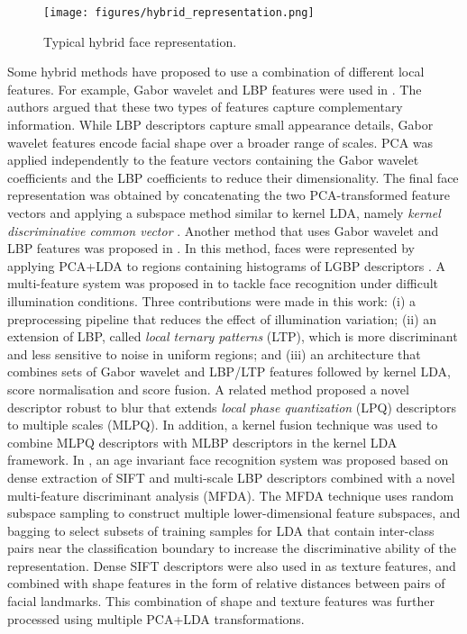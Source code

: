 \documentclass[conference]{IEEEtran}
\begin{document}
\begin{figure}[tb]
    \centering
    \texttt{[image: figures/hybrid\_representation.png]}
    \caption{Typical hybrid face representation.}
    \label{fig:hybrid_representation}
\end{figure}

Some hybrid methods have proposed to use a combination of different local features. For example, Gabor wavelet and LBP features were used in \cite{tan2007fusing}. The authors argued that these two types of features capture complementary information. While LBP descriptors capture small appearance details, Gabor wavelet features encode facial shape over a broader range of scales. PCA was applied independently to the feature vectors containing the Gabor wavelet coefficients and the LBP coefficients to reduce their dimensionality. The final face representation was obtained by concatenating the two PCA-transformed feature vectors and applying a subspace method similar to kernel LDA, namely \textit{kernel discriminative common vector} \cite{cevikalp2006discriminative}. Another method that uses Gabor wavelet and LBP features was proposed in \cite{shan2006ensemble}. In this method, faces were represented by applying PCA+LDA to regions containing histograms of LGBP descriptors \cite{zhang2005local}. A multi-feature system was proposed in \cite{tan2010enhanced} to tackle face recognition under difficult illumination conditions. Three contributions were made in this work: (i) a preprocessing pipeline that reduces the effect of illumination variation; (ii) an extension of LBP, called \textit{local ternary patterns} (LTP), which is more discriminant and less sensitive to noise in uniform regions; and (iii) an architecture that combines sets of Gabor wavelet and LBP/LTP features followed by kernel LDA, score normalisation and score fusion. A related method \cite{chan2013multiscale} proposed a novel descriptor robust to blur that extends \textit{local phase quantization} (LPQ) descriptors \cite{rahtu2012local} to multiple scales (MLPQ). In addition, a kernel fusion technique was used to combine MLPQ descriptors with MLBP descriptors in the kernel LDA framework. In \cite{li2011discriminative}, an age invariant face recognition system was proposed based on dense extraction of SIFT and multi-scale LBP descriptors combined with a novel multi-feature discriminant analysis (MFDA). The MFDA technique uses random subspace sampling \cite{ho1998random} to construct multiple lower-dimensional feature subspaces, and bagging \cite{breiman1996bagging} to select subsets of training samples for LDA that contain inter-class pairs near the classification boundary to increase the discriminative ability of the representation. Dense SIFT descriptors were also used in \cite{saez2016shape} as texture features, and combined with shape features in the form of relative distances between pairs of facial landmarks. This combination of shape and texture features was further processed using multiple PCA+LDA transformations.
\end{document}
